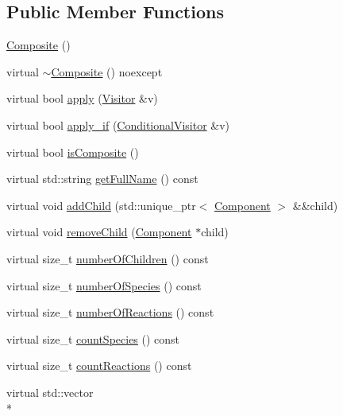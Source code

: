 \subsection*{Public Member Functions}
\begin{DoxyCompactItemize}
\item 
\hyperlink{classchem_1_1Composite_ae3444220cf51ab3db2616ea4833c4770}{Composite} ()
\item 
virtual \hyperlink{classchem_1_1Composite_a36a86821952d10911595120d3d26d683}{$\sim$\-Composite} () noexcept
\item 
virtual bool \hyperlink{classchem_1_1Composite_a65464170b82b4531efe620e23e68ea12}{apply} (\hyperlink{classchem_1_1Visitor}{Visitor} \&v)
\item 
virtual bool \hyperlink{classchem_1_1Composite_ac0ef45069901807e72d478ec59736ee4}{apply\-\_\-if} (\hyperlink{classchem_1_1ConditionalVisitor}{Conditional\-Visitor} \&v)
\item 
virtual bool \hyperlink{classchem_1_1Composite_ae4b190f0f14a61d40f68f4a4a51e9192}{is\-Composite} ()
\item 
virtual std\-::string \hyperlink{classchem_1_1Composite_a7781095451c19c48996856153c29bf6b}{get\-Full\-Name} () const 
\item 
virtual void \hyperlink{classchem_1_1Composite_a7f0737d480f68cb2e37eb061a1cfac36}{add\-Child} (std\-::unique\-\_\-ptr$<$ \hyperlink{classchem_1_1Component}{Component} $>$ \&\&child)
\item 
virtual void \hyperlink{classchem_1_1Composite_a1db2418dfbd583f05088fb4695fda677}{remove\-Child} (\hyperlink{classchem_1_1Component}{Component} $\ast$child)
\item 
virtual size\-\_\-t \hyperlink{classchem_1_1Composite_a89545dad587539c07acff13398e8ee7a}{number\-Of\-Children} () const 
\item 
virtual size\-\_\-t \hyperlink{classchem_1_1Composite_a97512e021c76460f0b982d4ff16a91d5}{number\-Of\-Species} () const 
\item 
virtual size\-\_\-t \hyperlink{classchem_1_1Composite_a0089cc7bf318c99339d098018ede34c7}{number\-Of\-Reactions} () const 
\item 
virtual size\-\_\-t \hyperlink{classchem_1_1Composite_a2c00f5f0be0b7dead8a0a5a53dde1a04}{count\-Species} () const 
\item 
virtual size\-\_\-t \hyperlink{classchem_1_1Composite_a1cba92a649f230eab8e0cecb39632640}{count\-Reactions} () const 
\item 
virtual std\-::vector\\*

\end{DoxyCompactItemize}

